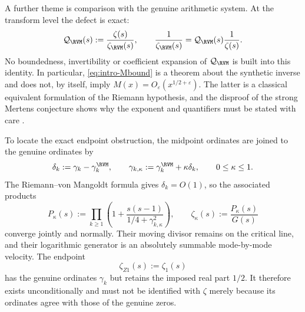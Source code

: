 A further theme is comparison with the genuine arithmetic system.  At the
transform level the defect is exact:
\begin{equation}
 \mathcal Q_{\RVM}(s)
 :=\frac{\zeta(s)}{\zeta_{\RVM}(s)},
 \qquad
 \frac1{\zeta_{\RVM}(s)}
 =\mathcal Q_{\RVM}(s)\frac1{\zeta(s)}.
 \label{eq:intro-defect}
\end{equation}
No boundedness, invertibility or coefficient expansion of
$\mathcal Q_{\RVM}$ is built into this identity.  In particular,
\eqref{eq:intro-Mbound} is a theorem about the synthetic inverse and does not,
by itself, imply
$M(x)=O_\varepsilon(x^{1/2+\varepsilon})$.  The latter is a classical
equivalent formulation of the Riemann hypothesis, and the disproof of the
strong Mertens conjecture shows why the exponent and quantifiers must be stated
with care \cite{Titchmarsh1986,OdlyzkoTeRiele1985}.

To locate the exact endpoint obstruction, the midpoint ordinates are joined to
the genuine ordinates by
\begin{equation}
 \delta_k:=\gamma_k-\gamma_k^{\RVM},
 \qquad
 \gamma_{k,\kappa}:=\gamma_k^{\RVM}+\kappa\delta_k,
 \qquad 0\le\kappa\le1.
 \label{eq:intro-transport}
\end{equation}
The Riemann--von Mangoldt formula gives $\delta_k=O(1)$, so the associated
products
\begin{equation}
 P_\kappa(s)
 :=\prod_{k\ge1}
 \left(1+\frac{s(s-1)}{1/4+\gamma_{k,\kappa}^2}\right),
 \qquad
 \zeta_\kappa(s):=\frac{P_\kappa(s)}{G(s)}
 \label{eq:intro-path}
\end{equation}
converge jointly and normally.  Their moving divisor remains on the critical
line, and their logarithmic generator is an absolutely summable mode-by-mode
velocity.  The endpoint
\begin{equation}
 \zeta_{Z1}(s):=\zeta_1(s)
\end{equation}
has the genuine ordinates $\gamma_k$ but retains the imposed real part $1/2$.
It therefore exists unconditionally and must not be identified with $\zeta$
merely because its ordinates agree with those of the genuine zeros.

